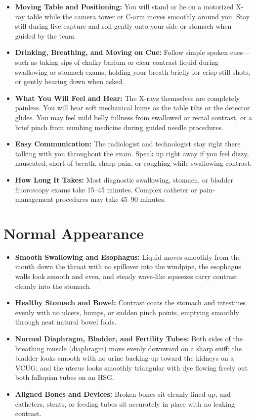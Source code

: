 \begin{itemize}
    \item \textbf{Moving Table and Positioning:} You will stand or lie on a motorized X-ray table while the camera tower or C-arm moves smoothly around you. Stay still during live capture and roll gently onto your side or stomach when guided by the team.
    \item \textbf{Drinking, Breathing, and Moving on Cue:} Follow simple spoken cues---such as taking sips of chalky barium or clear contrast liquid during swallowing or stomach exams, holding your breath briefly for crisp still shots, or gently bearing down when asked.
    \item \textbf{What You Will Feel and Hear:} The X-rays themselves are completely painless. You will hear soft mechanical hums as the table tilts or the detector glides. You may feel mild belly fullness from swallowed or rectal contrast, or a brief pinch from numbing medicine during guided needle procedures.
    \item \textbf{Easy Communication:} The radiologist and technologist stay right there talking with you throughout the exam. Speak up right away if you feel dizzy, nauseated, short of breath, sharp pain, or coughing while swallowing contrast.
    \item \textbf{How Long It Takes:} Most diagnostic swallowing, stomach, or bladder fluoroscopy exams take 15--45 minutes. Complex catheter or pain-management procedures may take 45--90 minutes.
\end{itemize}

\section{Normal Appearance}

\begin{itemize}
    \item \textbf{Smooth Swallowing and Esophagus:} Liquid moves smoothly from the mouth down the throat with no spillover into the windpipe, the esophagus walls look smooth and even, and steady wave-like squeezes carry contrast cleanly into the stomach.
    \item \textbf{Healthy Stomach and Bowel:} Contrast coats the stomach and intestines evenly with no ulcers, bumps, or sudden pinch points, emptying smoothly through neat natural bowel folds.
    \item \textbf{Normal Diaphragm, Bladder, and Fertility Tubes:} Both sides of the breathing muscle (diaphragm) move evenly downward on a sharp sniff; the bladder looks smooth with no urine backing up toward the kidneys on a VCUG; and the uterus looks smoothly triangular with dye flowing freely out both fallopian tubes on an HSG.
    \item \textbf{Aligned Bones and Devices:} Broken bones sit cleanly lined up, and catheters, stents, or feeding tubes sit accurately in place with no leaking contrast.
\end{itemize}

